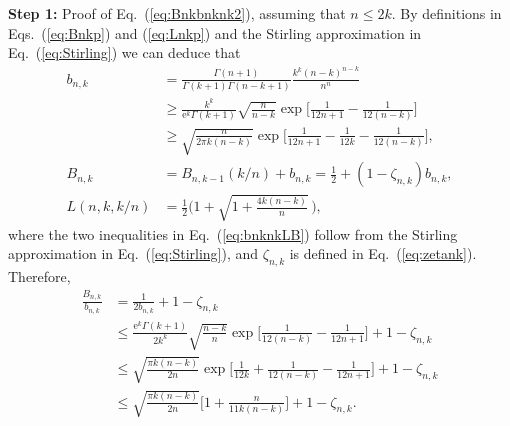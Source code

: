 \documentclass[aop]{imsart}
\theoremstyle{plain}
\theoremstyle{remark}
\newcommand{\rme}{\mathrm{e}}
\newcommand{\1}{\operatorname{\uppercase\expandafter{\romannumeral1}}}
\newcommand{\2}{\operatorname{\uppercase\expandafter{\romannumeral2}}}
\newcommand{\3}{\operatorname{\uppercase\expandafter{\romannumeral3}}}
\newcommand{\4}{\operatorname{\uppercase\expandafter{\romannumeral4}}}
\newcommand{\5}{\operatorname{\uppercase\expandafter{\romannumeral5}}}
\newcommand{\6}{\operatorname{\uppercase\expandafter{\romannumeral6}}}
\newcommand{\7}{\operatorname{\uppercase\expandafter{\romannumeral7}}}
\newcommand{\8}{\operatorname{\uppercase\expandafter{\romannumeral8}}}
\newcommand{\9}{\operatorname{\uppercase\expandafter{\romannumeral9}}}
\newcommand{\eref}[1]{Eq.~\textup{(\ref{#1})}}
\newcommand{\eqsref}[2]{Eqs.~(\ref{#1}) and (\ref{#2})}
\begin{document}
\begin{appendix}
\textbf{Step 1:} Proof of \eref{eq:Bnkbnknk2}, assuming that $n\leq 2k$. By definitions in \eqsref{eq:Bnkp}{eq:Lnkp} and the Stirling approximation in 
\eref{eq:Stirling} we can deduce that
	\begin{align}
	b_{n,k}&=\frac{\Gamma(n+1)}{\Gamma(k+1)\Gamma(n-k+1)}\frac{k^k (n-k)^{n-k}}{n^n} \label{eq:bnknkLB} \\
	&\geq \frac{k^k}{\rme^k\Gamma(k+1)}\sqrt{\frac{n}{n-k}}
	\exp\biggl[\frac{1}{12n+1}-\frac{1}{12(n-k)}\biggr]\nonumber\\
	&\geq \sqrt{\frac{n}{2\pi k(n-k)}}\exp\biggl[\frac{1}{12n+1}-\frac{1}{12 k}-\frac{1}{12(n-k)}\biggr], \nonumber
	\\
	B_{n,k}&=B_{n,k-1}(k/n)+b_{n,k}=\frac{1}{2}+(1-\zeta_{n,k}) b_{n,k},\\
	L(n,k,k/n)&=\frac{1}{2}\biggl(1+\sqrt{1+\frac{4k(n-k)}{n}}\,\biggr), \label{eq:Lnknk}
	\end{align}
	where the two inequalities in \eref{eq:bnknkLB} follow from the Stirling approximation in \eref{eq:Stirling}, and $\zeta_{n,k}$ is defined in \eref{eq:zetank}. Therefore,
	\begin{align}
	\frac{B_{n,k}}{b_{n,k}}&=\frac{1}{2b_{n,k}}+1-\zeta_{n,k} \label{eq:BnkbnkUB3}	\\
	&\leq 
	\frac{\rme^k\Gamma(k+1)}{2k^k}\sqrt{\frac{n-k}{n}}
	\exp\biggl[\frac{1}{12(n-k)}-\frac{1}{12n+1}\biggr]+1-\zeta_{n,k}
\nonumber	\\
	&\leq \sqrt{\frac{\pi k(n-k)}{2n}}\exp\biggl[\frac{1}{12 k}+\frac{1}{12(n-k)}-\frac{1}{12n+1}\biggr]+1-\zeta_{n,k} 
\nonumber	\\
	&\leq \sqrt{\frac{\pi k(n-k)}{2n}}\biggl[1+\frac{n}{11k(n-k)}\biggr]
+1-\zeta_{n,k}. \nonumber
	\end{align}
	

\end{appendix}
\end{document}
